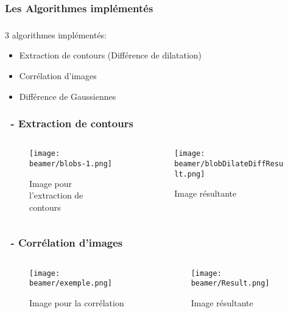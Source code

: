 \documentclass[11pt]{beamer}
\begin{document}
\subsubsection*{Les Algorithmes implémentés}
\begin{frame}
\frametitle{\subsubsecname}
\begin{block}{3 algorithmes implémentés:}
\begin{itemize}
\item Extraction de contours (Différence de dilatation)
\item Corrélation d'images
\item Différence de Gaussiennes 
\end{itemize}
\end{block}
\end{frame}
\begin{frame}
\frametitle{\subsecname ~- Extraction de contours}
\begin{columns}
		\begin{column}{5cm}
			\begin{figure}
				\texttt{[image: beamer/blobs-1.png]}

				Image pour l'extraction de contours
			\end{figure}
		\end{column}
		\begin{column}{5cm}

			\begin{figure}
				\texttt{[image: beamer/blobDilateDiffResult.png]}

				Image résultante
			\end{figure}
		\end{column}
	\end{columns}
\end{frame}
\begin{frame}
\frametitle{\subsecname ~- Corrélation d'images}
	\begin{columns}
		\begin{column}{5cm}
			\begin{figure}
				\texttt{[image: beamer/exemple.png]}

				Image pour la corrélation
			\end{figure}
		\end{column}
		\begin{column}{5cm}

			\begin{figure}
				\texttt{[image: beamer/Result.png]}

				Image résultante
			\end{figure}
		\end{column}
	\end{columns}
\end{frame}
\end{document}
